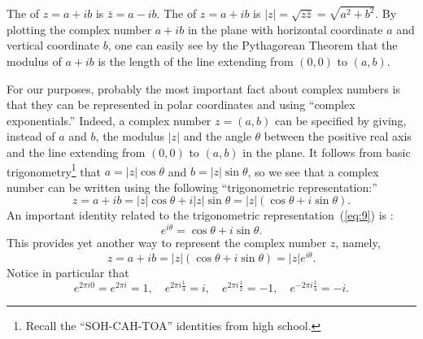 
The  of $z = a+ib$ is 
$\bar{z} = a-ib$. The  of 
$z = a+ib$ is $|z| = \sqrt{z \bar{z}} = \sqrt{a^2 + b^2}$.  By plotting
the complex number $a+ib$ in the plane with horizontal coordinate $a$
and vertical coordinate $b$, one can easily see by the Pythagorean Theorem
that the modulus of $a+ib$ is the length of the line extending from $(0,0)$
to $(a,b)$.

For our purposes, probably the most important fact about complex numbers 
is that they can be represented in polar coordinates and using
``complex exponentials.'' Indeed, a complex number 
$z = (a,b)$ can be specified by giving, instead of $a$ and $b$, 
the modulus $|z|$ and the angle $\theta$
between the positive real axis and the line extending from $(0,0)$ to 
$(a,b)$ in the plane.  It follows from basic trigonometry\footnote{Recall the
``SOH-CAH-TOA'' identities from high school.}
that $a = |z|\cos \theta$ and $b = |z|\sin \theta$, so we see that a
complex number can be written using the following ``trigonometric representation:''
\begin{equation}
  \label{eq:9}
z = a + i b = |z|\cos \theta + i|z|\sin \theta
= |z|(\cos \theta + i\sin \theta).
\end{equation}
An important identity related to the trigonometric representation~(\ref{eq:9})
is
: 
\[
e^{i\theta} = \cos \theta + i\sin \theta.
\] 
This provides yet another way to represent the complex number $z$, namely,
\[
z = a + i b  = |z|(\cos \theta + i\sin \theta) =  |z|e^{i\theta}.
\]
Notice in particular that %
\[
e^{2\pi i 0} = e^{2\pi i } = 1, \quad  %
e^{2\pi i\frac{1}{4}} = i, \quad e^{2\pi i\frac{1}{2}}= -1,  \quad e^{-2 \pi i\frac{1}{4}} = -i.
\]


